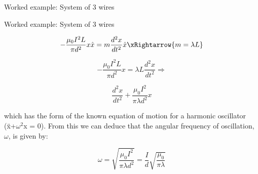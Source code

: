 {\begin{frame}{Worked example: System of 3 wires}
\end{frame}

%
%
%

\begin{frame}{Worked example: System of 3 wires}

  \begin{equation*}
      - \frac{\mu_0 I^2 L}{\pi d^2} x \hat{x} = m \frac{d^2 x}{dt^2} \hat{x}
      \xRightarrow{m = \lambda L}
  \end{equation*}

  \begin{equation*}
      - \frac{\mu_0 I^2 L}{\pi d^2} x = \lambda L \frac{d^2 x}{dt^2} \Rightarrow
  \end{equation*}

  \begin{equation*}
     \frac{d^2 x}{dt^2} + \frac{\mu_0 I^2}{\pi \lambda d^2} x
  \end{equation*}

  which has the form of the known equation of
  motion for a harmonic oscillator (\"x+$\omega^2$x = 0).
  From this we can deduce that the angular frequency of oscillation, $\omega$,
  is given by:

  \begin{equation*}
     \omega = \sqrt{\frac{\mu_0 I^2}{\pi \lambda d^2}} =
      \frac{I}{d} \sqrt{\frac{\mu_0}{\pi \lambda}}
  \end{equation*}

\end{frame}

} %


%
%

